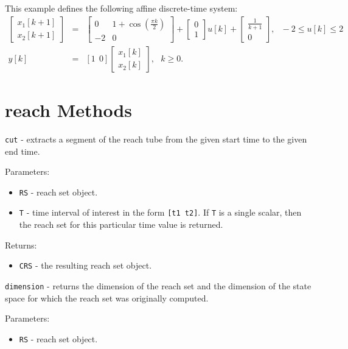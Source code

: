 \documentclass{report}
\begin{document}
This example defines the following affine discrete-time system:
\begin{eqnarray*}
\left[\begin{array}{c}
x_1[k+1]\\
x_2[k+1]\end{array}\right] & = & \left[\begin{array}{cc}
0 & 1 + \cos(\frac{\pi k}{2})\\
-2 & 0\end{array}\right] + \left[\begin{array}{c}
0\\
1\end{array}\right]u[k] + \left[\begin{array}{c}
\frac{1}{k+1}\\
0\end{array}\right], ~~~ -2\leq u[k]\leq2\\
y[k] & = & [1 ~~ 0]\left[\begin{array}{c}
x_1[k]\\
x_2[k]\end{array}\right], ~~~ k\geq0.
\end{eqnarray*}

\newpage

\section{reach Methods}
{\Large {\tt cut}} - extracts a segment of the reach tube from the given start
time to the given end time.

Parameters:
\begin{itemize}
\item {\tt RS} - reach set object.
\item {\tt T} - time interval of interest in the form {\tt [t1 t2]}.
If {\tt T} is a single scalar, then the reach set for this particular time
value is returned.
\end{itemize}

Returns:
\begin{itemize}
\item {\tt CRS} - the resulting reach set object.
\end{itemize}

\newpage

{\Large {\tt dimension}} - returns the dimension of the reach set and
the dimension of the state space for which the reach set was originally
computed.

Parameters:
\begin{itemize}
\item {\tt RS} - reach set object.
\end{itemize}
\end{document}
